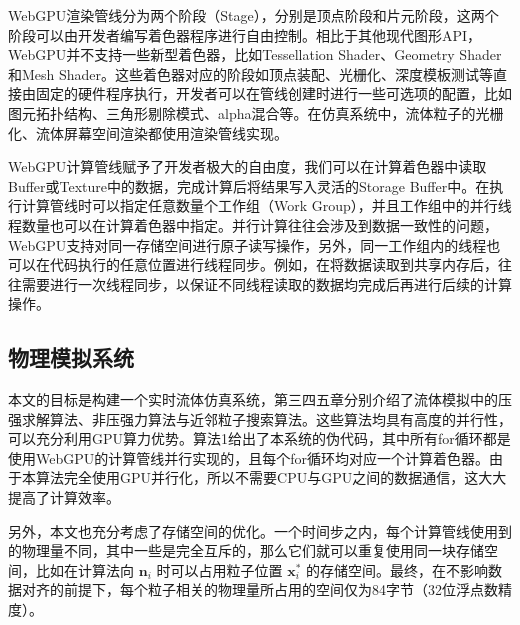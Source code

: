     WebGPU渲染管线分为两个阶段（Stage），分别是顶点阶段和片元阶段，这两个阶段可以由开发者编写着色器程序进行自由控制。相比于其他现代图形API，WebGPU并不支持一些新型着色器，比如Tessellation Shader、Geometry Shader和Mesh Shader。这些着色器对应的阶段如顶点装配、光栅化、深度模板测试等直接由固定的硬件程序执行，开发者可以在管线创建时进行一些可选项的配置，比如图元拓扑结构、三角形剔除模式、alpha混合等。在仿真系统中，流体粒子的光栅化、流体屏幕空间渲染都使用渲染管线实现。
    
    WebGPU计算管线赋予了开发者极大的自由度，我们可以在计算着色器中读取Buffer或Texture中的数据，完成计算后将结果写入灵活的Storage Buffer中。在执行计算管线时可以指定任意数量个工作组（Work Group），并且工作组中的并行线程数量也可以在计算着色器中指定。并行计算往往会涉及到数据一致性的问题，WebGPU支持对同一存储空间进行原子读写操作，另外，同一工作组内的线程也可以在代码执行的任意位置进行线程同步。例如，在将数据读取到共享内存后，往往需要进行一次线程同步，以保证不同线程读取的数据均完成后再进行后续的计算操作。

\subsection{物理模拟系统}
    本文的目标是构建一个实时流体仿真系统，第三四五章分别介绍了流体模拟中的压强求解算法、非压强力算法与近邻粒子搜索算法。这些算法均具有高度的并行性，可以充分利用GPU算力优势。算法1给出了本系统的伪代码，其中所有for循环都是使用WebGPU的计算管线并行实现的，且每个for循环均对应一个计算着色器。由于本算法完全使用GPU并行化，所以不需要CPU与GPU之间的数据通信，这大大提高了计算效率。
    
    另外，本文也充分考虑了存储空间的优化。一个时间步之内，每个计算管线使用到的物理量不同，其中一些是完全互斥的，那么它们就可以重复使用同一块存储空间，比如在计算法向 $\mathbf n_i$ 时可以占用粒子位置 $\mathbf x_i^*$ 的存储空间。最终，在不影响数据对齐的前提下，每个粒子相关的物理量所占用的空间仅为84字节（32位浮点数精度）。

